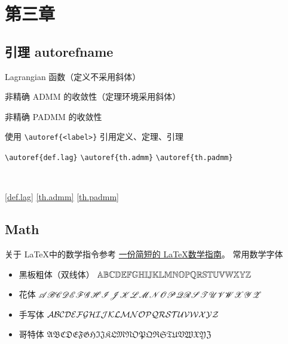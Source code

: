 \chapter{第三章}

\section{引理 autorefname}

\begin{definition}[Lagrangian]\label{def.lag}
    Lagrangian 函数（定义不采用斜体）
\end{definition}

\begin{theorem}[ADMM]\label{th.admm}
    非精确 ADMM 的收敛性（定理环境采用斜体）
\end{theorem}

\begin{lemma}[PADMM]\label{th.padmm}
    非精确 PADMM 的收敛性
\end{lemma}

使用 \verb|\autoref{<label>}| 引用定义、定理、引理

\vspace{10bp}

\begin{minipage}{.3\textwidth}
    \verb|\autoref{def.lag}|\newline
    \verb|\autoref{th.admm}|\newline
    \verb|\autoref{th.padmm}|
\end{minipage}
~~~~
\begin{minipage}{.3\textwidth}
    \autoref{def.lag}\newline
    \autoref{th.admm}\newline
    \autoref{th.padmm}
\end{minipage}

\section{Math}

关于 \LaTeX 中的数学指令参考 \href{https://mirrors.sjtug.sjtu.edu.cn/ctan/info/short-math-guide/}{一份简短的 \LaTeX 数学指南}。
常用数学字体
\begin{itemize}
    \item 黑板粗体（双线体） $\mathbb{ABCDEFGHIJKLMNOPQRSTUVWXYZ}$
    \item 花体 $\mathscr{ABCDEFGHIJKLMNOPQRSTUVWXYZ}$
    \item 手写体 $\mathcal{ABCDEFGHIJKLMNOPQRSTUVWXYZ}$
    \item 哥特体 $\mathfrak{ABCDEFGHIJKLMNOPQRSTUVWXYZ}$
\end{itemize}


